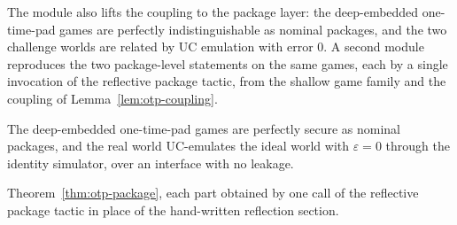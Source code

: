 The module also lifts the coupling to the package layer: the deep-embedded
one-time-pad games are perfectly indistinguishable as nominal packages, and the
two challenge worlds are related by UC emulation with error $0$. A second
module reproduces the two package-level statements on the same games, each by a
single invocation of the reflective package tactic, from the shallow game family
and the coupling of Lemma~\ref{lem:otp-coupling}.

\begin{theorem}
  \label{thm:otp-package}
  \leanok
  The deep-embedded one-time-pad games are perfectly secure as nominal packages,
  and the real world UC-emulates the ideal world with $\varepsilon = 0$ through
  the identity simulator, over an interface with no leakage.
\end{theorem}

\begin{theorem}
  \label{thm:otp-reflect}
  \leanok
  Theorem~\ref{thm:otp-package}, each part obtained by one call of the
  reflective package tactic in place of the hand-written reflection section.
\end{theorem}
